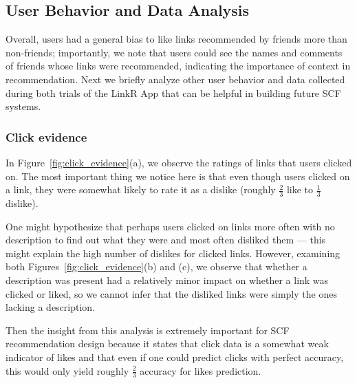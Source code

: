 \subsection{User Behavior and Data Analysis}

\label{sec:behavior}

Overall, users had a general bias to like links recommended by friends
more than non-friends; importantly, we note that users could see the
names and comments of friends whose links were recommended, indicating
the importance of context in recommendation.  Next we briefly analyze
other user behavior and data collected during both trials of the
LinkR App that can be helpful in building future SCF systems.

\subsubsection{Click evidence}

In Figure~\ref{fig:click_evidence}(a), we observe the ratings of links
that users clicked on.  The most important thing we notice 
here is that even though users
clicked on a link, they were somewhat likely to rate it as a dislike
(roughly $\frac{2}{3}$ like to $\frac{1}{3}$ dislike).

One might hypothesize that perhaps users clicked on links more often
with no description to find out what they were and most often disliked
them --- this might explain the high number of dislikes for clicked
links.  However, examining both Figures~\ref{fig:click_evidence}(b)
and (c), we observe that whether a description was present had a
relatively minor impact on whether a link was clicked or liked, so we
cannot infer that the disliked links were simply the ones lacking a
description.

Then the insight from this analysis is extremely important 
for SCF recommendation design because it states that click data is a somewhat 
weak indicator of likes and that even if one could predict 
clicks with perfect accuracy, this would only yield 
roughly $\frac{2}{3}$ accuracy for likes prediction.

